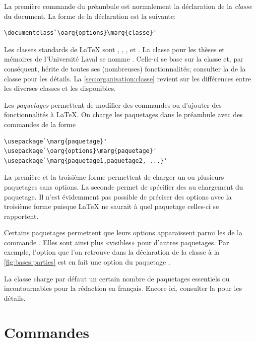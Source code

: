 La première commande du préambule est normalement la déclaration de la
\emph{classe} du document. La forme de la déclaration est la suivante:
\begin{lstlisting}
\documentclass`\oarg{options}\marg{classe}'
\end{lstlisting}
Les classes standards de {\LaTeX} sont ,
, ,  et . La
classe pour les thèses et mémoires de l'Université Laval se nomme
 \citep{ulthese}. Celle-ci se base sur la classe
 et, par conséquent, hérite de toutes ses (nombreuses)
fonctionnalités; consulter la %
de la classe  pour les détails. La
\autoref{sec:organisation:classe} revient sur les différences entre les
diverses classes et les  disponibles.

Les \emph{paquetages} permettent de modifier des commandes ou
d'ajouter des fonctionnalités à {\LaTeX}. On charge les paquetages
dans le préambule avec des commandes de la forme
\begin{lstlisting}
\usepackage`\marg{paquetage}'
\usepackage`\oarg{options}\marg{paquetage}'
\usepackage`\marg{paquetage1,paquetage2, ...}'
\end{lstlisting}
La première et la troisième forme permettent de charger un ou
plusieurs paquetages sans options. La seconde permet de spécifier des
 au chargement du paquetage. Il n'est évidemment pas
possible de préciser des options avec la troisième forme puisque
{\LaTeX} ne saurait à quel paquetage celles-ci se rapportent.

Certains paquetages permettent que leurs options apparaissent parmi
les  de la commande \cmdprint{\documentclass}. Elles
sont ainsi plus «visibles» pour d'autres paquetages. Par exemple,
l'option  que l'on retrouve dans la déclaration de la
classe à la \autoref{fig:bases:parties} est en fait une option du
paquetage .

La classe  charge par défaut un certain nombre de
paquetages essentiels ou incontournables pour la rédaction en
français. Encore ici, consulter la %
pour les détails.


\section{Commandes}
\label{sec:bases:commandes}

